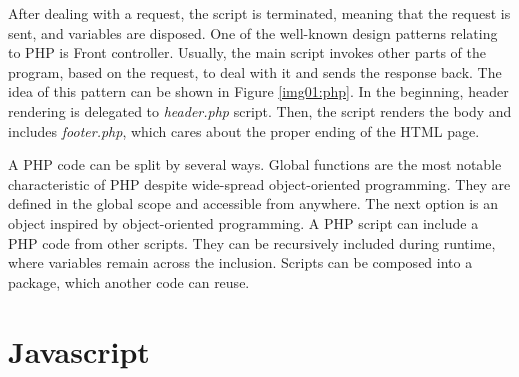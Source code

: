After dealing with a request, the script is terminated, meaning that the request is sent, and variables are disposed.
One of the well-known design patterns relating to PHP is Front controller.
Usually, the main script invokes other parts of the program, based on the request, to deal with it and sends the response back.
The idea of this pattern can be shown in Figure \ref{img01:php}.
In the beginning, header rendering is delegated to \textit{header.php} script.
Then, the script renders the body and includes \textit{footer.php}, which cares about the proper ending of the HTML page.
\par
A PHP code can be split by several ways.
Global functions are the most notable characteristic of PHP despite wide-spread object-oriented programming.
They are defined in the global scope and accessible from anywhere.
The next option is an object inspired by object-oriented programming.
A PHP script can include a PHP code from other scripts.
They can be recursively included during runtime, where variables remain across the inclusion.
Scripts can be composed into a package, which another code can reuse.

\section{Javascript}


